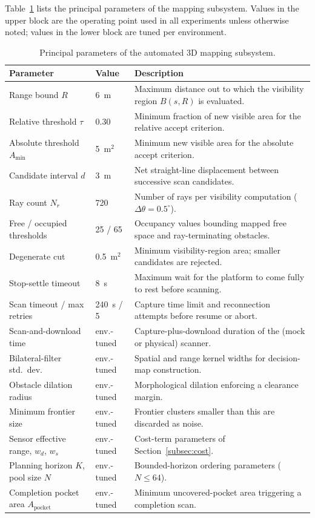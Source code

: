 Table~\ref{tab:params} lists the principal parameters of the mapping
subsystem. Values in the upper block are the operating point used in all
experiments unless otherwise noted; values in the lower block are tuned per
environment.

\begin{table}[htbp]
  \centering
  \caption{Principal parameters of the automated 3D mapping subsystem.}
  \label{tab:params}
  \begin{tabularx}{\textwidth}{l l X}
    \toprule
    \textbf{Parameter} & \textbf{Value} & \textbf{Description} \\
    \midrule
    Range bound $R$ & 6~m & Maximum distance out to which the visibility region $B(s,R)$ is evaluated. \\
    Relative threshold $\tau$ & 0.30 & Minimum fraction of new visible area for the relative accept criterion. \\
    Absolute threshold $A_{\min}$ & 5~m$^2$ & Minimum new visible area for the absolute accept criterion. \\
    Candidate interval $d$ & 3~m & Net straight-line displacement between successive scan candidates. \\
    Ray count $N_r$ & 720 & Number of rays per visibility computation ($\Delta\theta=0.5^\circ$). \\
    Free / occupied thresholds & 25 / 65 & Occupancy values bounding mapped free space and ray-terminating obstacles. \\
    Degenerate cut & 0.5~m$^2$ & Minimum visibility-region area; smaller candidates are rejected. \\
    Stop-settle timeout & 8~s & Maximum wait for the platform to come fully to rest before scanning. \\
    Scan timeout / max retries & 240~s / 5 & Capture time limit and reconnection attempts before resume or abort. \\
    \midrule
    Scan-and-download time & env.-tuned & Capture-plus-download duration of the (mock or physical) scanner. \\
    Bilateral-filter std.\ dev. & env.-tuned & Spatial and range kernel widths for decision-map construction. \\
    Obstacle dilation radius & env.-tuned & Morphological dilation enforcing a clearance margin. \\
    Minimum frontier size & env.-tuned & Frontier clusters smaller than this are discarded as noise. \\
    Sensor effective range, $w_d$, $w_s$ & env.-tuned & Cost-term parameters of Section~\ref{subsec:cost}. \\
    Planning horizon $K$, pool size $N$ & env.-tuned & Bounded-horizon ordering parameters ($N\le64$). \\
    Completion pocket area $A_{\mathrm{pocket}}$ & env.-tuned & Minimum uncovered-pocket area triggering a completion scan. \\
    \bottomrule
  \end{tabularx}
\end{table}
